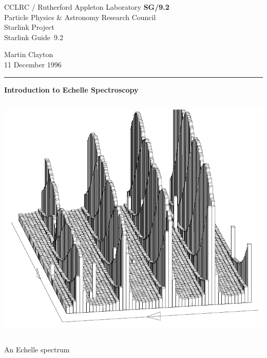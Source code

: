 \documentclass[twoside,11pt]{article}
\newcommand{\stardoccategory}  {Starlink Guide}
\newcommand{\stardocinitials}  {SG}
\newcommand{\stardocnumber}    {9.2}
\newcommand{\stardocauthors}   {Martin Clayton}
\newcommand{\stardocdate}      {11 December 1996}
\newcommand{\stardoctitle}     {Introduction to Echelle Spectroscopy}
\newcommand{\stardocversion}   {[software-version]}
\newcommand{\stardocmanual}    {[manual-type]}
\newcommand{\stardocname}{\stardocinitials /\stardocnumber}
\newenvironment{latexonly}{}{}
\begin{document}
\thispagestyle{empty}

\begin{latexonly}
   CCLRC / {\sc Rutherford Appleton Laboratory} \hfill {\bf \stardocname}\\
   {\large Particle Physics \& Astronomy Research Council}\\
   {\large Starlink Project\\}
   {\large \stardoccategory\ \stardocnumber}
   \begin{flushright}
   \stardocauthors\\
   \stardocdate
   \end{flushright}
   \vspace{-4mm}
   \rule{\textwidth}{0.5mm}
   \vspace{5mm}
   \begin{center}
   {\Huge\bf  \stardoctitle \\ [2.5ex]}
   \end{center}
   \vspace{5mm}

   \begin{center}
   \leavevmode\includegraphics[height=120mm]{sg9_cover}

   An Echelle spectrum
   \end{center}

\end{latexonly}
\end{document}
